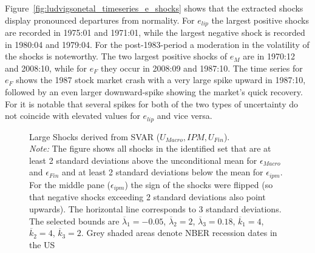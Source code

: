\documentclass[a4paper,11pt,listof=nochaptergap,oneside,pointednumbers,bibtotoc,bigheadings,liststotoc]{scrbook}
\theoremstyle{mysatz}
\theoremstyle{mydefinition}
\theoremstyle{mytheorem}
\theoremstyle{mybemerkung}
\begin{document}
Figure~\ref{fig:ludvigsonetal_timeseries_e_shocks} shows that the extracted shocks display pronounced departures from normality. For $e_{lip}$ the largest positive shocks are recorded in 1975:01 and 1971:01, while the largest negative shock is recorded in 1980:04 and 1979:04. For the post-1983-period a moderation in the volatility of the shocks is noteworthy. The two largest positive shocks of $e_{M}$ are in 1970:12 and 2008:10, while for $e_{F}$ they occur in 2008:09 and 1987:10. The time series for $e_{F}$ shows the 1987 stock market crash with a very large spike upward in 1987:10, followed by an even larger downward-spike showing the market's quick recovery. For \citet{ludvigsonetal:18} it is notable that several spikes for both of the two types of uncertainty do not coincide with elevated values for $e_{lip}$ and vice versa.




\begin{figure}[!h]
   \centering
   \setlength\fboxsep{0pt}
   \setlength\fboxrule{0pt}
      \caption[Large Shocks derived from SVAR ($U_{Macro}, IPM, U_{Fin}$).]{Large Shocks derived from SVAR ($U_{Macro}, IPM, U_{Fin}$).\\
      \textit{Note:}  The figure shows all shocks in the identified set that are at least 2 standard deviations above the unconditional mean for $\epsilon_{Macro}$ and $\epsilon_{Fin}$ and at least 2 standard deviations below the mean for $\epsilon_{ipm}$. For the middle pane ($\epsilon_{ipm}$) the sign of the shocks were flipped (so that negative shocks exceeding 2 standard deviations also point upwards). The horizontal line corresponds to 3 standard deviations. The selected bounds are $\overline{\lambda}_1 = -0.05$, $\overline{\lambda}_2 = 2$, $\overline{\lambda}_3 = 0.18$, $\overline{k}_1 = 4$, $\overline{k}_2 = 4$, $\overline{k}_3 = 2$. Grey shaded areas denote NBER recession dates in the US}   \label{fig:ludvigsonetal_timeseries_e_largeshocks}
\end{figure}
\end{document}
